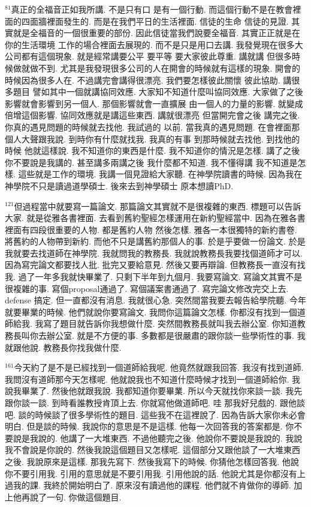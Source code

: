\documentclass{book}
\begin{document}
$^{81}$真正的全福音正如我所講.
不是只有口 是有一個行動.
而這個行動不是在教會裡面的四面牆裡面發生的.
而是在我們平日的生活裡面.
信徒的生命 信徒的見證.
其實就是全福音的一個很重要的部份.
因此信徒當我們說要全福音.
其實正正就是在你的生活環境 工作的場合裡面去展現的.
而不是只是用口去講.
我發覺現在很多大公司都有這個現象.
就是經常講要公平 要平等 要大家彼此尊重.
講就講 但很多時候做就做不到.
尤其是我發現很多公司的人在開會的時候就有這樣的現象.
開會的時候因為很多人在.
不過講完會講得很漂亮.
我們要怎樣彼此關懷 彼此協助.
講很多題目 譬如其中一個就講協同效應.
大家知不知道什麼叫協同效應.
大家做了之後 影響就會影響到另一個人.
那個影響就會一直擴展 由一個人的力量的影響.
就變成倍增這個影響.
協同效應就是講這些東西.
講就很漂亮 但當開完會之後 講完之後.
你真的遇見問題的時候就去找他.
我試過的 以前.
當我真的遇見問題.
在會裡面那個人大聲跟我說.
到時你有什麼就找我.
我真的有事 到那時候就去找他.
到找他的時候 他就這樣說.
我不知道你的東西是什麼.
我不知道你的情況是怎樣.
講了之後你不要說是我講的.
甚至講多兩講之後 我什麼都不知道.
我不懂得講 我不知道是怎樣.
這些就是工作的環境.
我講一個見證給大家聽.
在神學院讀書的時候.
因為我在神學院不只是讀過道學碩士.
後來去到神學碩士 原本想讀PhD.

$^{121}$但過程當中就要寫一篇論文.
那篇論文其實就不是很複雜的東西.
標題可以告訴大家.
就是從雅各書裡面.
去看到舊約聖經怎樣運用在新約聖經當中.
因為在雅各書裡面有四段很重要的人物.
都是舊約人物 然後怎樣.
雅各一本很獨特的新約書卷.
將舊約的人物帶到新約.
而他不只是講舊約那個人的事.
於是乎要做一份論文.
於是我就要去找道師在神學院.
我就問我的教務長.
我就說教務長我要找個道師才可以.
因為寫完論文都要找人批.
批完又要給意見.
然後又要再辯論.
但教務長一直沒有找我.
過了一年多我就快畢業了.
只剩下半年到九個月.
我要寫論文.
寫論文其實不是很複雜的事.
寫個proposal通過了.
寫個議案書通過了.
寫完論文修改完交上去.
defense 搞定.
但一直都沒有消息.
我就很心急.
突然間當我要去報告給學院聽.
今年就要畢業的時候.
他們就說你要寫論文.
我問你這篇論文怎樣.
你都沒有找到一個道師給我.
我寫了題目就告訴你我想做什麼.
突然間教務長就叫我去辦公室.
你知道教務長叫你去辦公室.
就是不方便的事.
多數都是很嚴肅的跟你談一些學術性的事.
我就跟他說.
教務長你找我做什麼.

$^{161}$今天約了是不是已經找到一個道師給我呢.
他竟然就跟我回答.
我沒有找到道師.
我問沒有道師那今天怎樣呢.
他就說我也不知道什麼時候才找到一個道師給你.
我說我畢業了.
然後他就跟我說.
我都知道你要畢業.
所以今天就找你來談一談.
我先跟你談一談.
到時看誰教授肯頂上去.
你就寫他做道師吧.
哇 那我好兒戲的.
跟他談吧.
談的時候談了很多學術性的題目.
這些我不在這裡說了.
因為告訴大家你未必會明白.
但是談的時候.
我說你的意思是不是這樣.
他每一次回答我的答案都是.
你不要說是我說的.
他講了一大堆東西.
不過他聽完之後.
他說你不要說是我說的.
我說我不會說是你說的.
然後我說這個題目又怎樣呢.
這個部分又跟他談了一大堆東西之後.
我說原來是這樣.
那我先寫下.
然後我寫下的時候.
你猜他怎樣回答我.
他說你不要引用我.
引用的意思就是不要引用我.
引用他說的話.
他說尤其是你都沒有上過我的課.
我終於開始明白了.
原來沒有讀過他的課程.
他們就不肯做你的導師.
加上他再說了一句.
你做這個題目.
\end{document}
